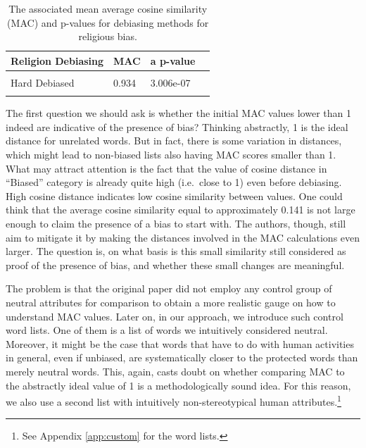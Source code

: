 \documentclass{clv3}
\begin{document}
\begin{table}
\footnotesize

\centering

\begin{tabular}[t]{lllr}
\toprule
Religion Debiasing & \textsf{MAC} & a p-value \\
\midrule
\cellcolor{gray!15}{Biased} & \cellcolor{gray!15}{0.859} & \cellcolor{gray!15}{N/A} \\
Hard Debiased & 0.934 & 3.006e-07\\
\cellcolor{gray!15}{Soft Debiased ($\lambda$ = 0.2)} & \cellcolor{gray!15}{0.894} & \cellcolor{gray!15}{0.007} \\
\bottomrule
\end{tabular}

\caption{The associated mean average cosine similarity
(\textsf{MAC}) and p-values for debiasing methods for religious bias.}
\label{tab:religionOriginal2}
\normalsize 
\end{table}

The first question we should ask is whether the initial \textsf{MAC}
values lower than 1 indeed are indicative of the presence of bias?
Thinking abstractly, 1 is the ideal distance for unrelated words. But in
fact, there is some variation in distances, which might lead to
non-biased lists also having \textsf{MAC} scores smaller than 1.
 What may attract attention is the fact that the value of
cosine distance in ``Biased'' category is already quite high (i.e.~close
to 1) even before debiasing. High cosine distance indicates low cosine
similarity between values. One could think that the average cosine
similarity equal to approximately 0.141 is not large enough to claim the
presence of a bias to start with. The authors, though, still aim to
mitigate it by making the distances involved in the \textsf{MAC}
calculations even larger. The question is, on what basis is this small
similarity still considered as proof of the presence of bias, and
whether these small changes are meaningful.

The problem is that the original paper did not employ any control group
of neutral attributes for comparison to obtain a more realistic gauge on
how to understand \textsf{MAC} values. Later on, in our approach, we
introduce such control word lists. One of them is a list of words we
intuitively considered neutral. Moreover, it might be the case that
words that have to do with human activities in general, even if
unbiased, are systematically closer to the protected words than merely
neutral words. This, again, casts doubt on whether comparing
\textsf{MAC} to the abstractly ideal value of 1 is a methodologically
sound idea. For this reason, we also use a second list with intuitively
non-stereotypical human attributes.\footnote{See Appendix
  \ref{app:custom} for the word lists.}
\end{document}
